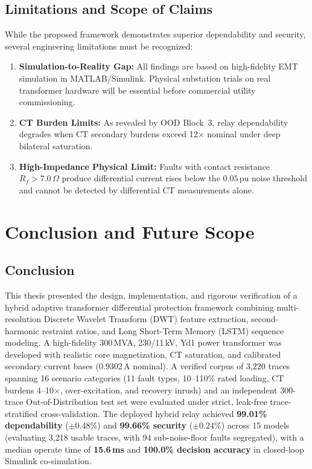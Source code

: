 \documentclass[12pt,a4paper,oneside]{report}
\begin{document}
\section{Limitations and Scope of Claims}
While the proposed framework demonstrates superior dependability and security, several engineering limitations must be recognized:
\begin{enumerate}[leftmargin=1.4em,itemsep=1.5pt,topsep=2pt,parsep=0pt]
\item \textbf{Simulation-to-Reality Gap:} All findings are based on high-fidelity EMT simulation in MATLAB/Simulink. Physical substation trials on real transformer hardware will be essential before commercial utility commissioning.
\item \textbf{CT Burden Limits:} As revealed by OOD Block~3, relay dependability degrades when CT secondary burdens exceed 12$\times$ nominal under deep bilateral saturation.
\item \textbf{High-Impedance Physical Limit:} Faults with contact resistance $R_f > 7.0\,\Omega$ produce differential current rises below the $0.05$\,pu noise threshold and cannot be detected by differential CT measurements alone.
\end{enumerate}

\chapter{Conclusion and Future Scope}
\section{Conclusion}
This thesis presented the design, implementation, and rigorous verification of a hybrid adaptive transformer differential protection framework combining multi-resolution Discrete Wavelet Transform (DWT) feature extraction, second-harmonic restraint ratios, and Long Short-Term Memory (LSTM) sequence modeling. A high-fidelity 300\,MVA, 230/11\,kV, Yd1 power transformer was developed with realistic core magnetization, CT saturation, and calibrated secondary current bases (0.9302\,A nominal). A verified corpus of 3{,}220 traces spanning 16 scenario categories (11 fault types, 10--110\% rated loading, CT burdens 4--10$\times$, over-excitation, and recovery inrush) and an independent 300-trace Out-of-Distribution test set were evaluated under strict, leak-free trace-stratified cross-validation. The deployed hybrid relay achieved \textbf{99.01\% dependability} ($\pm0.48\%$) and \textbf{99.66\% security} ($\pm0.24\%$) across 15 models (evaluating 3{,}218 usable traces, with 94 sub-noise-floor faults segregated), with a median operate time of \textbf{15.6\,ms} and \textbf{100.0\% decision accuracy} in closed-loop Simulink co-simulation.
\end{document}
